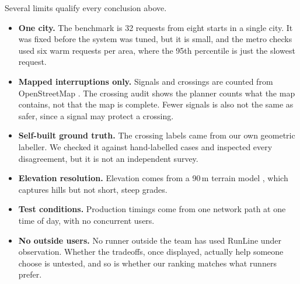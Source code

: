 Several limits qualify every conclusion above.
\begin{itemize}
\item \textbf{One city.} The benchmark is 32 requests from eight starts in a
  single city. It was fixed before the system was tuned, but it is small, and
  the metro checks used six warm requests per area, where the 95th percentile
  is just the slowest request.
\item \textbf{Mapped interruptions only.} Signals and crossings are counted
  from OpenStreetMap \citep{osmwiki2026signals}. The crossing audit shows the
  planner counts what the map contains, not that the map is complete. Fewer
  signals is also not the same as safer, since a signal may protect a
  crossing.
\item \textbf{Self-built ground truth.} The crossing labels came from our own
  geometric labeller. We checked it against hand-labelled cases and inspected
  every disagreement, but it is not an independent survey.
\item \textbf{Elevation resolution.} Elevation comes from a 90\,m terrain
  model \citep{copernicus2022dem}, which captures hills but not short, steep
  grades.
\item \textbf{Test conditions.} Production timings come from one network
  path at one time of day, with no concurrent users.
\item \textbf{No outside users.} No runner outside the team has used
  RunLine under observation. Whether the tradeoffs, once displayed, actually
  help someone choose is untested, and so is whether our ranking matches
  what runners prefer.
\end{itemize}
